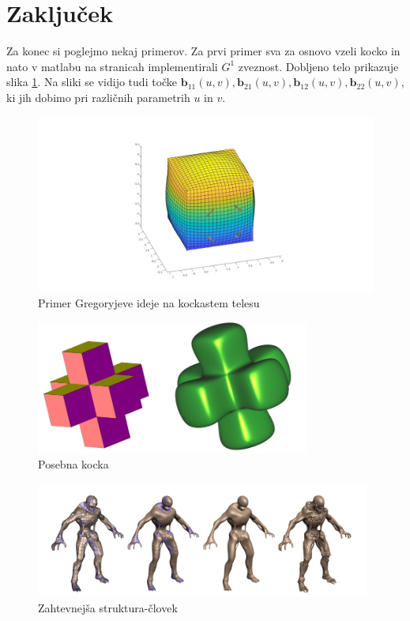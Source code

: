\documentclass[a4paper,regno]{article}
\newcommand{\tbf}{\textbf}
\begin{document}
\section{Zaključek}
Za konec si poglejmo nekaj primerov. Za prvi primer  sva za osnovo vzeli kocko in nato v matlabu na stranicah implementirali $G^1$ zveznost. Dobljeno telo prikazuje slika \ref{fig:g_kocka}. Na sliki se vidijo tudi točke $\tbf{b}_{11}(u,v),
\tbf{b}_{21}(u,v), \tbf{b}_{12}(u,v), \tbf{b}_{22}(u,v)$, ki jih dobimo pri različnih parametrih $u$ in $v$.
\begin{figure}[h]
	\centering
	\includegraphics[width=15cm]{gregory_kocka.jpg}
	\caption{Primer Gregoryjeve ideje na kockastem telesu}
	\label{fig:g_kocka}
\end{figure}

\begin{figure}[h]
	\centering
	\includegraphics[width=9cm]{posebna_kocka.jpg}
	\caption{Posebna kocka}
\end{figure}

\begin{figure}[H]
	\centering
	\includegraphics[width=11cm]{koncni_primer.png}
	\caption{Zahtevnejša struktura-človek}
	\label{človek}
\end{figure}
\end{document}
